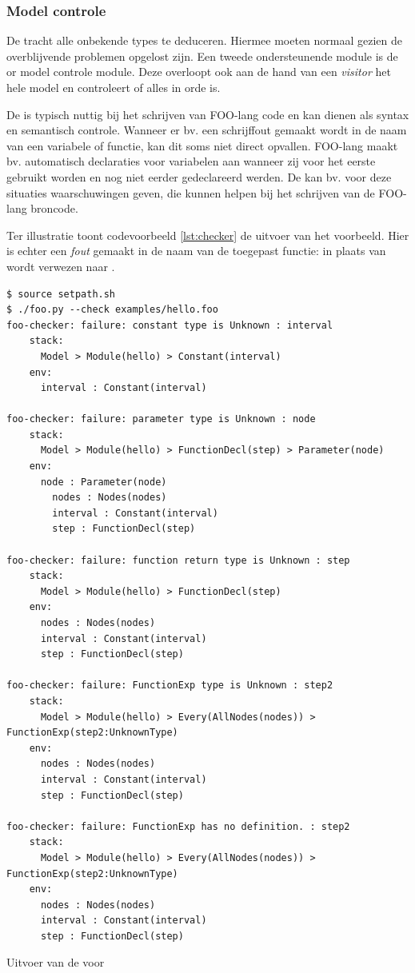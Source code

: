 \subsubsection{Model controle}

De  tracht alle onbekende types te deduceren. Hiermee
moeten normaal gezien de overblijvende problemen opgelost zijn. Een tweede
ondersteunende module is de  or model controle module. Deze
overloopt ook aan de hand van een \emph{visitor} het hele model en controleert
of alles in orde is.

De  is typisch nuttig bij het schrijven van FOO-lang code
en kan dienen als syntax en semantisch controle. Wanneer er bv. een schrijffout
gemaakt wordt in de naam van een variabele of functie, kan dit soms niet direct
opvallen. FOO-lang maakt bv. automatisch declaraties voor variabelen aan
wanneer zij voor het eerste gebruikt worden en nog niet eerder gedeclareerd
werden. De  kan bv. voor deze situaties waarschuwingen
geven, die kunnen helpen bij het schrijven van de FOO-lang broncode.

Ter illustratie toont codevoorbeeld \ref{lst:checker} de uitvoer van het
 voorbeeld. Hier is echter een \emph{fout} gemaakt in de naam
van de toegepast functie: in plaats van  wordt verwezen naar
.

\begin{listing}[ht]
  \begin{verbatim}
$ source setpath.sh
$ ./foo.py --check examples/hello.foo
foo-checker: failure: constant type is Unknown : interval
    stack:
      Model > Module(hello) > Constant(interval)
    env:
      interval : Constant(interval)
      
foo-checker: failure: parameter type is Unknown : node
    stack:
      Model > Module(hello) > FunctionDecl(step) > Parameter(node)
    env:
      node : Parameter(node)
        nodes : Nodes(nodes)
        interval : Constant(interval)
        step : FunctionDecl(step)
      
foo-checker: failure: function return type is Unknown : step
    stack:
      Model > Module(hello) > FunctionDecl(step)
    env:
      nodes : Nodes(nodes)
      interval : Constant(interval)
      step : FunctionDecl(step)
      
foo-checker: failure: FunctionExp type is Unknown : step2
    stack:
      Model > Module(hello) > Every(AllNodes(nodes)) > FunctionExp(step2:UnknownType)
    env:
      nodes : Nodes(nodes)
      interval : Constant(interval)
      step : FunctionDecl(step)
      
foo-checker: failure: FunctionExp has no definition. : step2
    stack:
      Model > Module(hello) > Every(AllNodes(nodes)) > FunctionExp(step2:UnknownType)
    env:
      nodes : Nodes(nodes)
      interval : Constant(interval)
      step : FunctionDecl(step)
  \end{verbatim}
  \vspace{-5mm}
  \caption{Uitvoer van de  voor }
  \label{lst:checker}
\end{listing}
